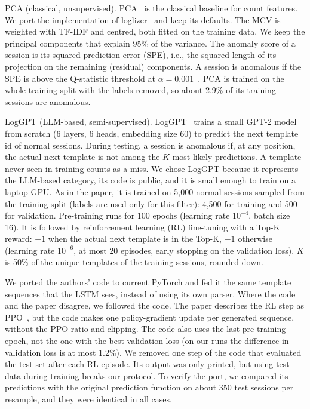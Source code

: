 \documentclass[10pt, conference]{IEEEtran}
\renewcommand{\paragraph}[1]{\noindent\textsf{#1}.}
\begin{document}
\paragraph{PCA (classical, unsupervised)} PCA~\cite{xu2009detecting} is the classical baseline for count features. We port the implementation of loglizer~\cite{he2016experience} and keep its defaults. The MCV is weighted with TF-IDF and centred, both fitted on the training data. We keep the principal components that explain 95\% of the variance. The anomaly score of a session is its squared prediction error (SPE), i.e., the squared length of its projection on the remaining (residual) components. A session is anomalous if the SPE is above the Q-statistic threshold at $\alpha=0.001$~\cite{jackson1979control}. PCA is trained on the whole training split with the labels removed, so about 2.9\% of its training sessions are anomalous.

\paragraph{LogGPT (LLM-based, semi-supervised)} LogGPT~\cite{han2023loggpt} trains a small GPT-2 model~\cite{radford2019gpt2} from scratch (6 layers, 6 heads, embedding size 60) to predict the next template id of normal sessions. During testing, a session is anomalous if, at any position, the actual next template is not among the $K$ most likely predictions. A template never seen in training counts as a miss. We chose LogGPT because it represents the LLM-based category, its code is public, and it is small enough to train on a laptop GPU. As in the paper, it is trained on 5,000 normal sessions sampled from the training split (labels are used only for this filter): 4,500 for training and 500 for validation. Pre-training runs for 100 epochs (learning rate $10^{-4}$, batch size 16). It is followed by reinforcement learning (RL) fine-tuning with a Top-K reward: $+1$ when the actual next template is in the Top-K, $-1$ otherwise (learning rate $10^{-6}$, at most 20 episodes, early stopping on the validation loss). $K$ is 50\% of the unique templates of the training sessions, rounded down.

We ported the authors' code to current PyTorch and fed it the same template sequences that the LSTM sees, instead of using its own parser. Where the code and the paper disagree, we followed the code. The paper describes the RL step as PPO~\cite{schulman2017ppo}, but the code makes one policy-gradient update per generated sequence, without the PPO ratio and clipping. The code also uses the last pre-training epoch, not the one with the best validation loss (on our runs the difference in validation loss is at most 1.2\%). We removed one step of the code that evaluated the test set after each RL episode. Its output was only printed, but using test data during training breaks our protocol. To verify the port, we compared its predictions with the original prediction function on about 350 test sessions per resample, and they were identical in all cases.
\end{document}
